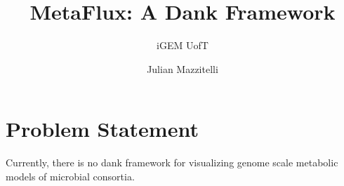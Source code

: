

\graphicspath{{./figures/}}

\hypersetup{
    colorlinks=true,
    linkcolor=black,
    urlcolor=cyan
}

\title{MetaFlux: A Dank Framework}
\author{iGEM UofT}
\date{Julian Mazzitelli}

\renewcommand*\contentsname{}

\def\Blender{\href{https://www.blender.org/}{Blender}}



\maketitle

\thispagestyle{empty}

\begin{bottompar}
\tableofcontents
\end{bottompar}

\newpage
\setcounter{page}{1}

\section{Problem Statement}

Currently, there is no dank framework for visualizing genome scale metabolic
models of microbial consortia.


